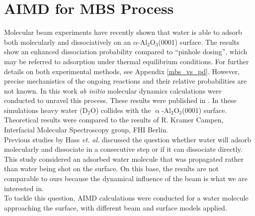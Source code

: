 \documentclass[11pt,DIV=13,BCOR=5mm,a4paper,headinclude]{scrbook}
\begin{document}
  
\section{AIMD for MBS Process}\label{sec_0001AIMD}
Molecular beam experiments have recently shown that water is able to adsorb both molecularly and dissociatively on an $\alpha$-Al$_{\text{2}}$O$_{\text{3}}$(0001) surface\cite{Wirth2014}.
The results show an enhanced dissociation probability compared to ``pinhole dosing'', which may be referred to adsorption under thermal equilibrium conditions.
For further details on both experimental methods, see Appendix \ref{mbs_vs_pd}.
However, precise mechanistics of the ongoing reactions  and their relative probabilities are not known.
In this work \textit{ab initio} molecular dynamics calculations were conducted to unravel this process.
These results were published in \cite{Heiden0001_2018}.
In these simulations heavy water (D$_2$O) collides with the $\upalpha$-Al$_{\text{2}}$O$_{\text{3}}$(0001) surface.
Theoretical results were compared to the results of R. Kramer Campen, Interfacial Molecular Spectroscopy group, FHI Berlin.
\\
Previous studies by Hass \textit{et. al.}\cite{hass98,hass00} discussed the question whether water will adsorb molecularly and dissociate in a consecutive step or if it can dissociate directly.
This study considered an adsorbed water molecule that was propagated rather than water being shot on the surface.
On this base, the results are not comparable to ours because the dynamical influence of the beam is what we are interested in.
\\
To tackle this question, AIMD calculations were conducted for a water molecule approaching the surface, with different beam and surface models applied.
\end{document}
